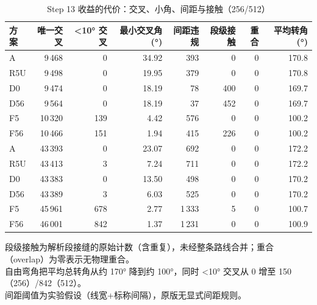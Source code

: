 \begin{table}[htbp]
  \centering
  \caption{Step 13 收益的代价：交叉、小角、间距与接触（256/512）}
  \label{tab:step13-cost}
  \begin{tabular}{lrrrrrrr}
    \toprule
    方案 & 唯一交叉 & <10° 交叉 & 最小交叉角 (°) & 间距违规 & 段级接触 & 重合 & 平均转角 (°) \\
    \midrule
    A & 9\,468 & 0 & 34.92 & 393 & 0 & 0 & 170.8 \\
    R5U & 9\,498 & 0 & 19.95 & 379 & 0 & 0 & 170.8 \\
    D0 & 9\,474 & 0 & 18.19 & 78 & 400 & 0 & 169.7 \\
    D56 & 9\,564 & 0 & 18.19 & 37 & 452 & 0 & 169.7 \\
    F5 & 10\,320 & 139 & 4.42 & 576 & 0 & 0 & 100.2 \\
    F56 & 10\,466 & 151 & 1.94 & 415 & 226 & 0 & 100.2 \\
    \midrule
    A & 43\,393 & 0 & 23.07 & 692 & 0 & 0 & 172.2 \\
    R5U & 43\,413 & 3 & 7.24 & 711 & 0 & 0 & 172.2 \\
    D0 & 43\,383 & 0 & 13.50 & 498 & 0 & 0 & 170.2 \\
    D56 & 43\,389 & 3 & 6.03 & 525 & 0 & 0 & 170.2 \\
    F5 & 45\,961 & 678 & 2.77 & 1\,333 & 5 & 0 & 100.7 \\
    F56 & 46\,001 & 842 & 1.37 & 1\,231 & 0 & 0 & 100.9 \\
    \bottomrule
  \end{tabular}
  \par\vspace{2pt}
  \begin{flushleft}\footnotesize
  段级接触为解析段接缝的原始计数（含重复），未经整条路线合并；重合（overlap）为零表示无物理重合。 \\
  自由弯角把平均总转角从约 170° 降到约 100°，同时 <10° 交叉从 0 增至 150（256）/842（512）。 \\
  间距阈值为实验假设（线宽+标称间隔），原版无显式间距规则。 \\
  \end{flushleft}
\end{table}
